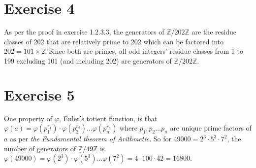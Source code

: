 \documentclass[12pt]{article}
\newcommand{\Z}{\mathbb{Z}}
\begin{document}
    \section*{Exercise 4}
    As per the proof in exercise 1.2.3.3,
    the generators of $\Z/202\Z$ are the residue classes of 202
    that are relatively prime to 202
    which can be factored into $202 = 101 \times 2$.
    Since both are primes, all odd integers' residue classes
    from 1 to 199 excluding 101 (and including 202) are generators
    of $\Z/202\Z$.


    \section*{Exercise 5}
    One property of $\varphi$, Euler's totient function,
    is that $\varphi(a)
    = \varphi(p_1^{r_1}) \cdot \varphi(p_2^{r_2}) \dots \varphi(p_n^{r_n})$
    where $p_1, p_2 \dots p_n$ are unique prime factors of $a$
    as per \textit{the Fundamental theorem of Arithmetic}.
    So for $49000 = 2^3 \cdot 5^3 \cdot 7^2$,
    the number of generators of $\Z/49\Z$
    is $\varphi(49000) = \varphi(2^3) \cdot \varphi(5^3) \dots \varphi(7^2)
    = 4 \cdot 100 \cdot 42 = 16800$.
\end{document}
